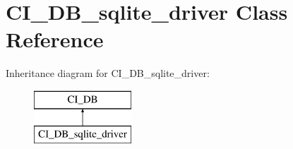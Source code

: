 \hypertarget{class_c_i___d_b__sqlite__driver}{\section{C\-I\-\_\-\-D\-B\-\_\-sqlite\-\_\-driver Class Reference}
\label{class_c_i___d_b__sqlite__driver}
}
Inheritance diagram for C\-I\-\_\-\-D\-B\-\_\-sqlite\-\_\-driver\-:\begin{figure}[H]
\begin{center}
\leavevmode
\includegraphics[height=2.000000cm]{class_c_i___d_b__sqlite__driver}
\end{center}
\end{figure}
